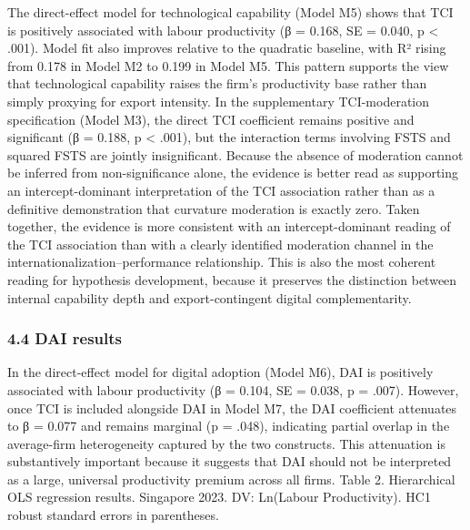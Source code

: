 \documentclass[12pt,a4paper]{article}
\begin{document}
The direct-effect model for technological capability (Model M5) shows
that TCI is positively associated with labour productivity (β = 0.168,
SE = 0.040, p \textless{} .001). Model fit also improves relative to the
quadratic baseline, with R² rising from 0.178 in Model M2 to 0.199 in
Model M5. This pattern supports the view that technological capability
raises the firm's productivity base rather than simply proxying for
export intensity. In the supplementary TCI-moderation specification
(Model M3), the direct TCI coefficient remains positive and significant
(β = 0.188, p \textless{} .001), but the interaction terms involving
FSTS and squared FSTS are jointly insignificant. Because the absence of
moderation cannot be inferred from non-significance alone, the evidence
is better read as supporting an intercept-dominant interpretation of the
TCI association rather than as a definitive demonstration that curvature
moderation is exactly zero. Taken together, the evidence is more
consistent with an intercept-dominant reading of the TCI association
than with a clearly identified moderation channel in the
internationalization--performance relationship. This is also the most
coherent reading for hypothesis development, because it preserves the
distinction between internal capability depth and export-contingent
digital complementarity.

\hypertarget{44-dai-results}{%
\subsubsection{4.4 DAI results}\label{44-dai-results}}

In the direct-effect model for digital adoption (Model M6), DAI is
positively associated with labour productivity (β = 0.104, SE = 0.038, p
= .007). However, once TCI is included alongside DAI in Model M7, the
DAI coefficient attenuates to β = 0.077 and remains marginal (p = .048),
indicating partial overlap in the average-firm heterogeneity captured by
the two constructs. This attenuation is substantively important because
it suggests that DAI should not be interpreted as a large, universal
productivity premium across all firms. Table 2. Hierarchical OLS
regression results. Singapore 2023. DV: Ln(Labour Productivity). HC1
robust standard errors in parentheses.
\end{document}
